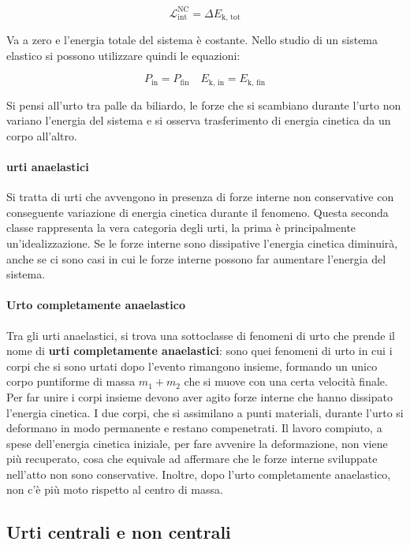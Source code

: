 \[
	\mathcal{L}_\text{int}^\text{NC}=\Delta E_\text{k, tot}
\]

Va a zero e l'energia totale del sistema è costante.
Nello studio di un sistema elastico si possono utilizzare quindi le equazioni:

\[
	P_\text{in}=P_\text{fin} \quad E_\text{k, in}=E_\text{k, fin}
\]

Si pensi all'urto tra palle da biliardo, le forze che si scambiano durante l'urto non variano l'energia del sistema e si osserva trasferimento di energia cinetica da un corpo all'altro.

\paragraph{urti anaelastici} Si tratta di urti che avvengono in presenza di forze interne non conservative con conseguente variazione di energia cinetica durante il fenomeno. Questa seconda classe rappresenta la vera categoria degli urti, la prima è principalmente un'idealizzazione. Se le forze interne sono dissipative l'energia cinetica diminuirà, anche se ci sono casi in cui le forze interne possono far aumentare l'energia del sistema.

\paragraph{Urto completamente anaelastico} Tra gli urti anaelastici, si trova una sottoclasse di fenomeni di urto che prende il nome di \textbf{urti completamente anaelastici}: sono quei fenomeni di urto in cui i corpi che si sono urtati dopo l'evento rimangono insieme, formando un unico corpo puntiforme di massa $m_1+m_2$ che si muove con una certa velocità finale. Per far unire i corpi insieme devono aver agito forze interne che hanno dissipato l'energia cinetica. I due corpi, che si assimilano a punti materiali, durante l'urto si deformano in modo permanente e restano compenetrati. Il lavoro compiuto, a spese dell'energia cinetica iniziale, per fare avvenire la deformazione, non viene più recuperato, cosa che equivale ad affermare che le forze interne sviluppate nell'atto non sono conservative. Inoltre, dopo l'urto completamente anaelastico, non c'è più moto rispetto al centro di massa.

\subsection{Urti centrali e non centrali}

